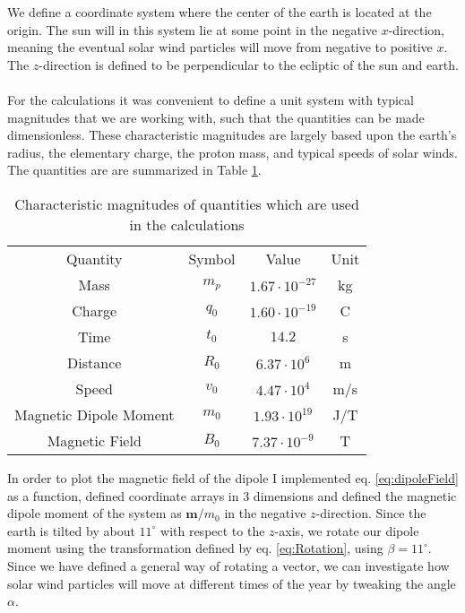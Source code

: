 We define a coordinate system where the center of the earth is located at the origin. The sun will in this system lie at some point in the negative $x$-direction, meaning the eventual solar wind particles will move from negative to positive $x$. The $z$-direction is defined to be perpendicular to the ecliptic of the sun and earth.\\
\\
For the calculations it was convenient to define a unit system with typical magnitudes that we are working with, such that the quantities can be made dimensionless. These characteristic magnitudes are largely based upon the earth's radius, the elementary charge, the proton mass, and typical speeds of solar winds. The quantities are are summarized in Table \ref{tab:characteristicMagnitudes}.

\begin{table}[h]
    \centering
    \begin{tabular}{c|c|c|c}
        Quantity & Symbol & Value & Unit\\
        Mass & $m_p$ & $1.67\cdot10^{-27}$ & kg \\
        Charge & $q_0$ & $1.60\cdot10^{-19}$ & C \\
        Time & $t_0$ & $14.2$ & s \\
        Distance & $R_0$ & $6.37\cdot 10^{6}$ & m \\
        Speed & $v_0$ & $4.47\cdot10^4$ & m/s \\
        Magnetic Dipole Moment & $m_0$ & $1.93\cdot10^{19}$ & J/T \\
        Magnetic Field & $B_0$ & $7.37\cdot10^{-9}$ & T
    \end{tabular}
    \caption{Characteristic magnitudes of quantities which are used in the calculations}
    \label{tab:characteristicMagnitudes}
\end{table}

\noindent In order to plot the magnetic field of the dipole I implemented eq. \ref{eq:dipoleField} as a function, defined coordinate arrays in 3 dimensions and defined the magnetic dipole moment of the system as $\boldsymbol{m}/m_0$ in the negative $z$-direction. Since the earth is tilted by about $11^{\circ}$ with respect to the $z$-axis, we rotate our dipole moment using the transformation defined by eq. \ref{eq:Rotation}, using $\beta=11^{\circ}$. Since we have defined a general way of rotating a vector, we can investigate how solar wind particles will move at different times of the year by tweaking the angle $\alpha$. 